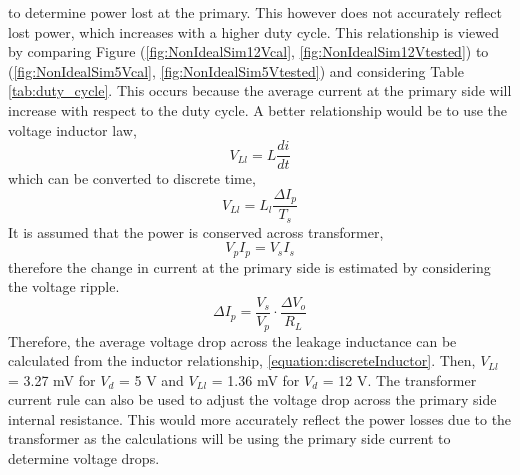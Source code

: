 \documentclass[12pt,twoside]{scrartcl}
\begin{document}
to determine power lost at the primary. This however does not accurately reflect lost power, which increases with a higher duty cycle. 
This relationship is viewed by comparing Figure (\ref{fig:NonIdealSim12Vcal}, \ref{fig:NonIdealSim12Vtested}) to (\ref{fig:NonIdealSim5Vcal}, \ref{fig:NonIdealSim5Vtested}) and considering Table \ref{tab:duty_cycle}.
This occurs because the average current at the primary side will increase with respect to the duty cycle. A better relationship would be to use the voltage inductor law,
\begin{equation}
    V_{Ll} = L \dfrac{di}{dt}
\end{equation} 
which can be converted to discrete time,
\begin{equation}
    V_{Ll} = L_l \dfrac{\Delta I_p}{T_s}
    \label{equation:discreteInductor}
\end{equation}
It is assumed that the power is conserved across transformer,
\begin{equation}
    V_pI_p = V_sI_s
\end{equation}
therefore the change in current at the primary side is estimated by considering the voltage ripple.
\begin{equation}
    \Delta I_p = \dfrac{V_s}{V_p} \cdot \dfrac{\Delta V_o}{R_L}
\end{equation} 
Therefore, the average voltage drop across the leakage inductance 
can be calculated from the inductor relationship, \ref{equation:discreteInductor}. Then, 
$V_{Ll}$ = 3.27 mV for $V_d$ = 5 V and $V_{Ll}$ = 1.36 mV for $V_d$ = 12 V. The transformer current rule
can also be used to adjust the voltage drop across the primary side internal resistance. This would more accurately 
reflect the power losses due to the transformer as the calculations will be using the primary side current to 
determine voltage drops. 


\newpage


\end{document}
